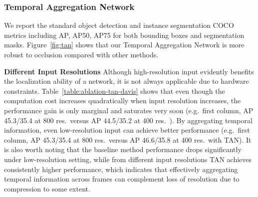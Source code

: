 \documentclass[10pt,twocolumn,letterpaper]{article}
\begin{document}
\subsubsection{Temporal Aggregation Network}
\vspace{-5pt}

We report the standard object detection and instance segmentation COCO metrics including AP, AP50, AP75 for both bounding boxes and segmentation masks. Figure~\ref{fig:tan} shows that our Temporal Aggregation Network is more robust to occlusion compared with other methods.

\begin{table}[]
  \small
    \centering
    \addtolength{\tabcolsep}{-5pt}
\caption{Results of Temporal Aggregation Network (TAN) on DAVIS validation set.
This table presents results under different input resolutions when comparing with the baseline (i.e. no TAN).}
\vspace{-1em}
\label{table:ablation-tan-davis}
\end{table}

\textbf{Different Input Resolutions}
Although high-resolution input evidently benefits the localization ability of a network, it is not always applicable due to  hardware constraints. Table~\ref{table:ablation-tan-davis} shows that
even though the computation cost increases quadratically when input resolution increases, the performance gain is only marginal and saturates very soon (e.g.\ first column, AP 45.3/35.4 at 800 res.\ versus AP 44.5/35.2 at 400 res.\ ).
By aggregating temporal information, even low-resolution input can achieve better performance (e.g.\ first column, AP 45.3/35.4 at 800 res.\ versus AP 46.6/35.8 at 400 res.\ with TAN). It is also worth noting that the baseline method performance drops significantly under low-resolution setting,
while from different input resolutions TAN achieves consistently higher performance,
which indicates that effectively aggregating temporal information across frames can complement loss of resolution due to compression to some extent.
\end{document}
